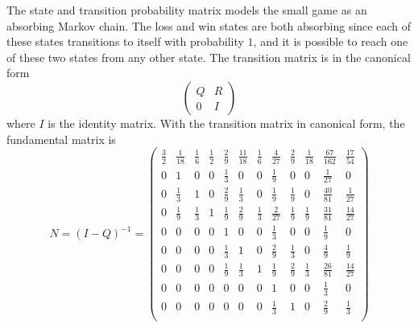 \documentclass[12pt]{article}
\begin{document}
\begin{example}
    The state and transition probability matrix models the small game as
    an absorbing Markov chain.  The loss and win states are both
    absorbing since each of these states transitions to itself with
    probability \( 1 \), and it is possible to reach one of these two
    states from any other state.  The transition matrix is in the
    canonical form
    \[
        \begin{pmatrix}
            Q   & R \\
            0   & I
        \end{pmatrix}
    \] where \( I \) is the identity matrix.  With the transition matrix
    in canonical form, the fundamental matrix is
    \[
        N = (I - Q)^{-1} =
        \begin{pmatrix}
            \frac{3}{2} & \frac{1}{18}  & \frac{1}{6}   & \frac{1}{2}
            & \frac{2}{9}       & \frac{11}{18} & \frac{1}{6}   & \frac{4}
            {27}        & \frac{2}{9}   & \frac{1}{18}  & \frac{67}{162}
                & \frac{17}{54}\\
            0   & 1     & 0     & 0     & \frac{1}{3}   & 0     & 0
            & \frac{1}{9}       & 0     & 0     & \frac{1}{27}  & 0\\
            0   & \frac{1}{3}   & 1     & 0     & \frac{2}{9}   & \frac{1}
            {3} & 0     & \frac{1}{9}   & \frac{1}{9}   & 0     & \frac{40}
            {81}        & \frac{1}{27}\\
            0   & \frac{1}{9}   & \frac{1}{3}   & 1     & \frac{1}{9}
            & \frac{2}{9}       & \frac{1}{3}   & \frac{2}{27}  & \frac{1}
            {9} & \frac{1}{9}   & \frac{31}{81} & \frac{14}{27}\\
            0   & 0     & 0     & 0     & 1     & 0     & 0     & \frac{1}
            {3} & 0     & 0     & \frac{1}{9}   & 0\\
            0   & 0     & 0     & 0     & \frac{1}{3}   & 1     & 0
            & \frac{2}{9}       & \frac{1}{3}   & 0     & \frac{4}{9}
            & \frac{1}{9}\\
            0   & 0     & 0     & 0     & \frac{1}{9}   & \frac{1}{3}
            & 1 & \frac{1}{9}   & \frac{2}{9}   & \frac{1}{3}   & \frac{26}
            {81}        & \frac{14}{27}\\
            0   & 0     & 0     & 0     & 0     & 0     & 0     & 1
            & 0 & 0     & \frac{1}{3}   & 0\\
            0   & 0     & 0     & 0     & 0     & 0     & 0     & \frac{1}
            {3} & 1     & 0     & \frac{2}{9}   & \frac{1}{3}\\

\end{pmatrix}\]
\end{example}
\end{document}
